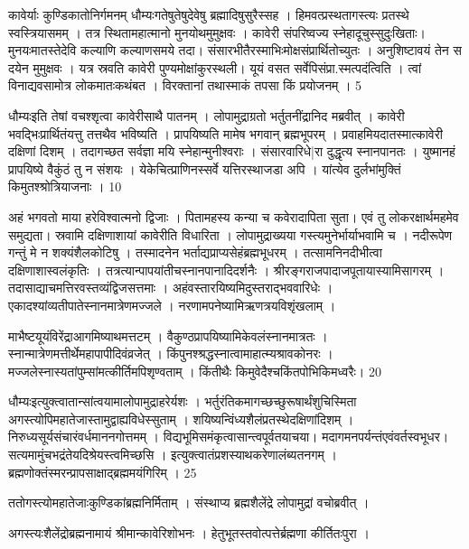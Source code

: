 कावेर्याः कुण्डिकातोनिर्गमनम् धौम्यःगतेषुतेषुदेवेषु ब्रह्मादिषुसुरैस्सह ।
हिमवत्प्रस्थतागस्त्यः प्रतस्थे स्वस्त्रियासमम् ।
तत्र स्थितामहात्मानो मुनयोथमुमुक्षवः ।
कावेरी संपरिष्वज्य स्नेहादूचुस्सुदुःखिताः।
मुनयःमातस्तेदेवि कल्याणि कल्याणसमये तदा।
संसारभीतैरस्माभिःमोक्षसंप्रार्थितोच्युतः ।
अनुशिष्टावयं तेन स दयेन मुमुक्षवः ।
यत्र स्रवति कावेरी पुण्यमोक्षांकुरस्थली।
यूयं वसत सर्वेपिसंप्रा.स्मत्पदंत्विति ।
त्वां विनाद्यवसामोत्र लोकमातःकथंबत ।
विरक्तानां तथास्माकं तपसा किं प्रयोजनम् ।
5

धौम्यःइति तेषां वचश्शृत्वा कावेरीसाथै पातनम् ।
लोपामुद्राग्रतो भर्तुतनींद्रानिद मब्रवीत् ।
कावेरी
भवद्भिःप्रार्थितंयत्तु तत्तथैव भविष्यति ।
प्रापयिष्यति मामेष भगवान् ब्रह्मभूपरम् ।
प्रवाहमियदातस्मात्कावेरी दक्षिणां दिशम् ।
तदागच्छत सर्वज्ञा मयि स्नेहान्मुनीश्वराः ।
संसारवारिधे|रा दुद्धृत्य स्नानपानतः ।
युष्मानहं प्रापयिष्ये वैकुंठं तु न संशयः ।
येकेचित्प्राणिनस्सर्वे यत्तिरस्थाजडा अपि ।
यांत्येव दुर्लभांमुक्तिं किमुतश्श्रोत्रियाजनाः ।
10

अहं भगवतो माया हरेविश्वात्मनो द्विजाः ।
पितामहस्य कन्या च कवेरादापिता सुता।
एवं तु लोकरक्षार्थमहमेव समुद्यता।
स्रवामि दक्षिणाशायां कावेरीति विधारिता ।
लोपामुद्राख्यया गस्त्यमुनेर्भार्याभवामि च ।
नदीरूपेण गन्तुं मे न शक्यंशैलकोटिषु ।
तस्मादनेन भर्ताद्यप्राप्यसेहंब्रह्मभूधरम् ।
तत्सामनिनदीभीत्वा दक्षिणाशास्वलंकृतिः ।
तत्रत्यान्पापयांतीचस्नानपानादिदर्शनैः ।
श्रीरङ्गराजपादाजपूतायास्यामिसागरम् ।
तदासाद्याचमत्तिरवस्तव्यंद्विजसत्तमाः ।
अहंवस्तारयिष्यमिदुस्तराद्भववारिधेः ।
एकादश्यांव्यतीपातेस्नानमात्रेणमज्जले ।
नरणामपनेष्यामिऋणत्रयविशृंखलाम् ।

माभैष्टयूयंविरेंद्राआगमिष्याथमत्तटम् ।
वैकुण्ठप्रापयिष्यामिकेवलंस्नानमात्रतः ।
स्नान्मात्रेणमत्तीर्थेमहापापीदिवंव्रजेत् ।
किंपुनश्श्रद्धस्नात्वामाहात्म्यश्रावकोनरः ।
मज्जलेस्नास्यतांपुम्सांमत्कीर्तिमपिशृण्वताम् ।
किंतीथैः किमुवेदैश्चकिंतपोभिकिमध्वरैः।
20

धौम्यःइत्युक्त्वातान्सांत्वयामालोपामुद्राहरेर्यशः ।
भर्तुरंतिकमागच्छच्छुरूषार्थंशुचिस्मिता अगस्त्योपिमहातेजास्तामुद्वाह्यविधेस्सुताम् ।
शयिष्यन्विंध्यशैलंप्रतस्थेदक्षिणांदिशम् ।
निरुध्यसूर्यसंचारंवर्धमाननगोत्तमम् ।
विद्यभूमिसमंकृत्वासान्त्वपूर्वतयाचया।
मदागमनपर्यन्तंएवंवर्तस्वभूधर।
सत्यमामुंचभद्रंतेयदिश्रेयस्त्वमिच्छसि ।
इत्युक्त्वातंप्रशस्याथकरेणालंब्यतनगम् ।
ब्रह्मणोक्तंस्मरन्प्रापसाक्षाद्ब्रह्ममयंगिरिम् ।
25

ततोगस्त्योमहातेजाःकुण्डिकांब्रह्मनिर्मिताम् ।
संस्थाप्य ब्रह्मशैलेंद्रे लोपामुद्रां वचोब्रवीत् ।

अगस्त्यःशैलेंद्रोब्रह्मनामायं श्रीमान्कावेरिशोभनः ।
हेतुभूतस्तवोत्पत्तेर्ब्रह्मणा कीर्तितःपुरा ।

